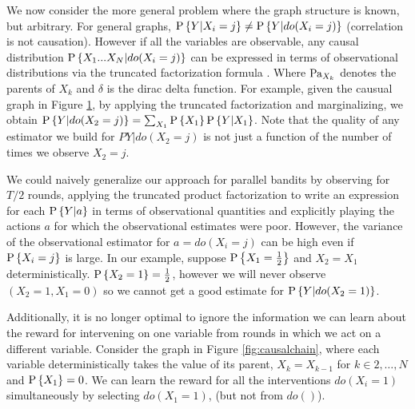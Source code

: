 
\newcommand{\calP}{\mathcal P}
\newcommand{\x}{\boldsymbol{x}}
\newcommand{\Ps}{\operatorname{P}}

We now consider the more general problem where the graph structure is known, but arbitrary. For general graphs, $\P{Y|X_i=j} \neq \P{Y|do(X_i=j)}$ (correlation is not causation). However if all the variables are observable, any causal distribution $\P{X_1...X_N|do(X_i=j)}$ can be expressed in terms of observational distributions via the truncated factorization formula \cite{Pearl2000}. 
Where $\parents{X_k}$ denotes the parents of $X_k$ and $\delta$ is the dirac delta function. For example, given the causual graph in Figure \ref{fig:causalStructure_confounded}, by applying the truncated factorization and marginalizing, we obtain $\P{Y|do(X_2= j)} = \sum_{X_1}\P{X_1}\P{Y|X_1}$.  Note that the quality of any estimator we build for $P{Y|do(X_2= j)}$ is not just a function of the number of times we observe $X_2 = j$.

\begin{figure}[h]
\centering
{}
\caption{}\label{fig:causalStructure_confounded}
\end{figure} 

We could naively generalize our approach for parallel bandits by observing for $T/2$ rounds, applying the truncated product factorization to write an expression for each $\P{Y|a}$ in terms of observational quantities and explicitly playing the actions $a$ for which the observational estimates were poor. However, the variance of the observational estimator for $a = do(X_i = j)$ can be high even if $\P{X_i = j}$ is large. In our example, suppose $\P{X_1=\frac{1}{2}}$ and $X_2 = X_1$ deterministically. $\P{X_2 = 1} = \frac{1}{2}$, however we will never observe $(X_2=1,X_1 = 0)$ so we cannot get a good estimate for $\P{Y|do(X_2=1)}$. 

Additionally, it is no longer optimal to ignore the information we can learn about the reward for intervening on one variable from rounds in which we act on a different variable. Consider the graph in Figure \ref{fig:causalchain}, where each variable deterministically takes the value of its parent, $X_k = X_{k-1}$ 
for $k\in {2,\ldots,N}$ and $\P{X_1} = 0$. 
We can learn the reward for all the interventions $do(X_i = 1)$ simultaneously by selecting $do(X_1 = 1)$, (but not from $do()$). 


